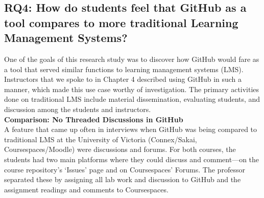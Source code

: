 



\subsection{RQ4: How do students feel that GitHub as a tool compares to more traditional Learning Management Systems?}
One of the goals of this research study was to discover how GitHub would fare as a tool that served similar functions to learning management systems (LMS). Instructors that we spoke to in Chapter 4 described using GitHub in such a manner, which made this use case worthy of investigation. The primary activities done on traditional LMS include material dissemination, evaluating students, and discussion among the students and instructors. \\

\textbf{Comparison: No Threaded Discussions in GitHub} \\
A feature that came up often in interviews when GitHub was being compared to traditional LMS at the University of Victoria (Connex/Sakai, Coursespaces/Moodle) were discussions and forums. For both courses, the students had two main platforms where they could discuss and comment---on the course repository's `Issues' page and on Coursespaces' Forums. The professor separated these by assigning all lab work and discussion to GitHub and the assignment readings and comments to Coursespaces.

